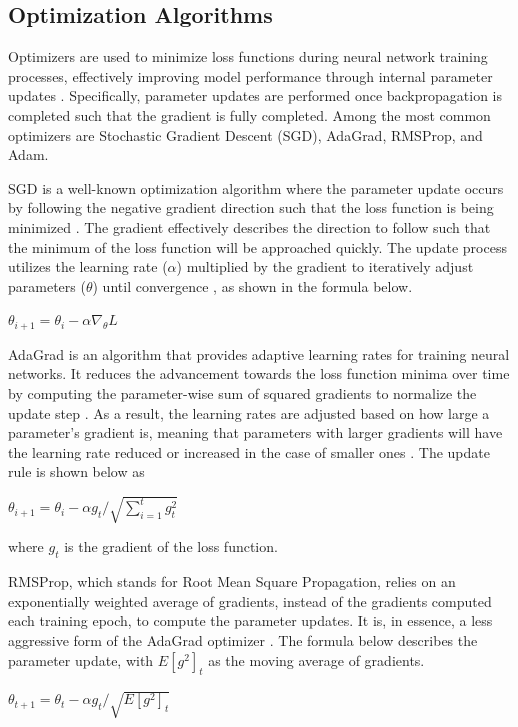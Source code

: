 \documentclass{article}
\begin{document}
\subsection{Optimization Algorithms}
Optimizers are used to minimize loss functions during neural network training processes, effectively improving model performance through internal parameter updates \cite{8862686}. Specifically, parameter updates are performed once backpropagation is completed such that the gradient is fully completed. Among the most common optimizers are Stochastic Gradient Descent (SGD), AdaGrad, RMSProp, and Adam.  

SGD is a well-known optimization algorithm where the parameter update occurs by following the negative gradient direction such that the loss function is being minimized \cite{8862686,cs231n}. The gradient effectively describes the direction to follow such that the minimum of the loss function will be approached quickly. The update process utilizes the learning rate ($\alpha$) multiplied by the gradient to iteratively adjust parameters ($\theta$) until convergence \cite{8862686}, as shown in the formula below.
\newline
\newline
\centerline{$\theta_{i+1} = \theta_i - \alpha \nabla_\theta L$ \cite{price_wong_yuan_mathews_olorunniwo_2020}}
\newline
\newline
AdaGrad is an algorithm that provides adaptive learning rates for training neural networks. It reduces the advancement towards the loss function minima over time by computing the parameter-wise sum of squared gradients to normalize the update step \cite{8862686,cs231n}. As a result, the learning rates are adjusted based on how large a parameter’s gradient is, meaning that parameters with larger gradients will have the learning rate reduced or increased in the case of smaller ones \cite{cs231n}. The update rule is shown below as
\newline
\newline
\centerline{
$\theta_{i+1} = \theta_i - \alpha g_t/ \sqrt{\sum_{i=1}^t g_t^2}$ \cite{kingma2014adam}}

where $g_t$ is the gradient of the loss function.
\newline

RMSProp, which stands for Root Mean Square Propagation, relies on an exponentially weighted average of gradients, instead of the gradients computed each training epoch, to compute the parameter updates. It is, in essence, a less aggressive form of the AdaGrad optimizer \cite{8862686,cs231n}. The formula below describes the parameter update, with $E[g^2]_t$ as the moving average of gradients.
\newline
\newline
\centerline{
$\theta_{t+1} = \theta_t - {{\alpha}g_{t}/{\sqrt{E[g^2]_t}}}  $ \cite{huang_2020}}
\end{document}
